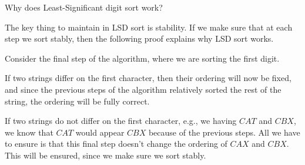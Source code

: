 \begin{blocksection}
\question Why does Least-Significant digit sort work?

\begin{solution}
The key thing to maintain in LSD sort is stability. If we make sure that at each step we sort stably, 
then the following proof explains why LSD sort works.

Consider the final step of the algorithm, where we are sorting the first digit. 

If two strings differ on the first character, then their ordering will now be fixed, and since the previous steps of the algorithm relatively sorted the rest of the string, the ordering will be fully correct.

If two strings do not differ on the first character, e.g., we having $CAT$ and $CBX$, we know that $CAT$ would appear $CBX$ because of the previous steps. All we have to ensure is that this final step doesn't change the ordering of $CAX$ and $CBX$. This will be ensured, since we make sure we sort stably.
\end{solution}
\end{blocksection}